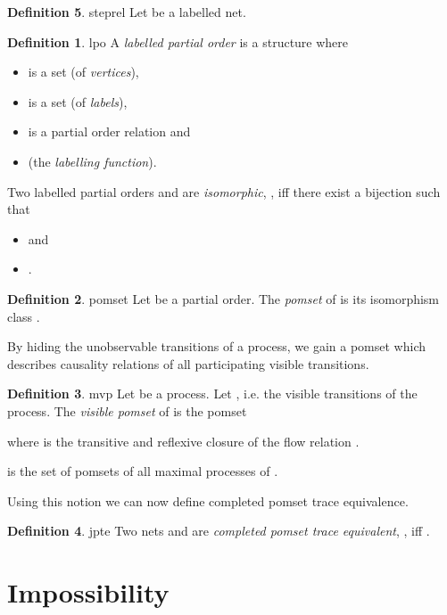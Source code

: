 \documentclass[submission,copyright,creativecommons]{eptcs}
\theoremstyle{definition}
\newtheorem{definition}{Definition}
\def\defitem#1{\emph{#1}}
\begin{document}
\begin{definition}{steprel}{
  Let  be a labelled net.
  }
\begin{definition}{lpo}{}
  A \defitem{labelled partial order} is a structure 
  where
  \begin{itemize}
    \item  is a set (of \defitem{vertices}),
    \item  is a set (of \defitem{labels}),
    \item  is a partial order relation and
    \item  (the \defitem{labelling function}).
  \end{itemize}

  Two labelled partial orders  and  are
  \defitem{isomorphic}, , iff there exist a bijection
   such that
  \begin{itemize}
    \item  and
    \item .
  \end{itemize}
\end{definition}

\begin{definition}{pomset}{
  Let  be a partial order.
  }
  The \defitem{pomset} of  is its isomorphism class .
\end{definition}

\noindent
By hiding the unobservable transitions of a process, we gain a pomset which
describes causality relations of all participating visible transitions.

\begin{definition}{mvp}{
  Let  be a process.
  }
  Let , i.e. the visible transitions of the process.
  The \defitem{visible pomset} of  is the pomset
  
  where  is the
  transitive and reflexive closure of the flow relation .
  
   is the set of pomsets of all maximal
  processes of .
\end{definition}

\noindent
Using this notion we can now define completed pomset trace equivalence.

\begin{definition}{jpte}{}
  Two nets  and  are \defitem{completed pomset trace equivalent}, , iff
  .
\end{definition}

\section{Impossibility}\label{sec-impossible}


\end{definition}
\end{document}
